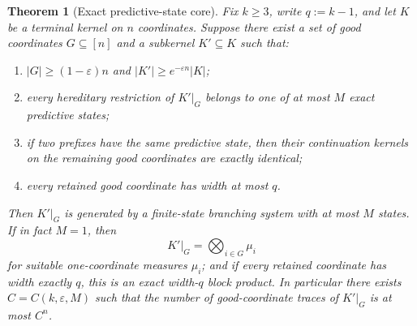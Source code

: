 \documentclass[11pt]{article}
\newtheorem{theorem}{Theorem}[section]
\theoremstyle{definition}
\newcommand{\eps}{\varepsilon}
\newcommand{\1}{\mathbf{1}}
\begin{document}
\begin{theorem}[Exact predictive-state core]\label{thm:predictive-state-core}
Fix $k\ge 3$, write $q:=k-1$, and let $K$ be a terminal kernel on $n$ coordinates. Suppose there exist a set of good coordinates $G\subseteq [n]$ and a subkernel $K'\subseteq K$ such that:
\begin{enumerate}[label=(\roman*),leftmargin=2.2em]
\item $|G|\ge (1-\eps)n$ and $|K'|\ge e^{-\eps n}|K|$;
\item every hereditary restriction of $K'|_G$ belongs to one of at most $M$ \emph{exact predictive states};
\item if two prefixes have the same predictive state, then their continuation kernels on the remaining good coordinates are exactly identical;
\item every retained good coordinate has width at most $q$.
\end{enumerate}
Then $K'|_G$ is generated by a finite-state branching system with at most $M$ states. If in fact $M=1$, then
\[
K'|_G=\bigotimes_{i\in G}\mu_i
\]
for suitable one-coordinate measures $\mu_i$; and if every retained coordinate has width exactly $q$, this is an exact width-$q$ block product. In particular there exists $C=C(k,\eps,M)$ such that the number of good-coordinate traces of $K'|_G$ is at most $C^n$.
\end{theorem}
\end{document}
